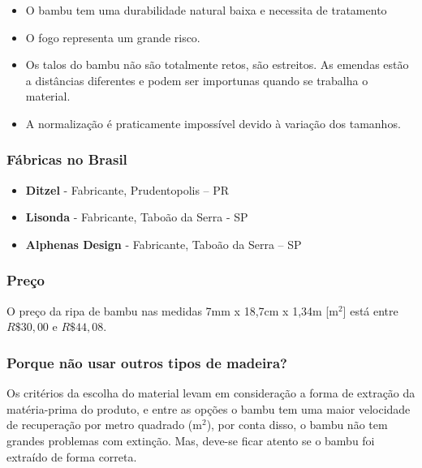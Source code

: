 	\begin{itemize}

		\item O bambu tem uma durabilidade natural baixa e necessita de tratamento

		\item O fogo representa um grande risco.

		\item Os talos do bambu não são totalmente retos, são estreitos. As emendas estão a distâncias diferentes e podem ser importunas quando se trabalha o material.

		\item A normalização é praticamente impossível devido à variação dos tamanhos.
	\end{itemize}

\subsubsection*{\textbf{Fábricas no Brasil}}

	\begin{itemize}

		\item \textbf{Ditzel} - Fabricante, Prudentopolis – PR

		\item \textbf{Lisonda} - Fabricante, Taboão da Serra - SP

		\item \textbf{Alphenas Design} - Fabricante, Taboão da Serra – SP

	\end{itemize}

\subsubsection*{\textbf{Preço}}

	O preço da ripa de bambu nas medidas 7mm x 18,7cm x 1,34m [$\si{\meter}^2$] está entre $R\$ 30,00$ e $R\$ 44,08$.

\subsubsection*{\textbf{Porque não usar outros tipos de madeira?}}
	
        Os critérios da escolha do material levam em consideração a forma de extração da matéria-prima do produto, e entre as opções o bambu tem uma maior velocidade de recuperação por metro quadrado (\si{\meter}$^2$), por conta disso, o bambu não tem grandes problemas com extinção. Mas, deve-se ficar atento se o bambu foi extraído de forma correta.

